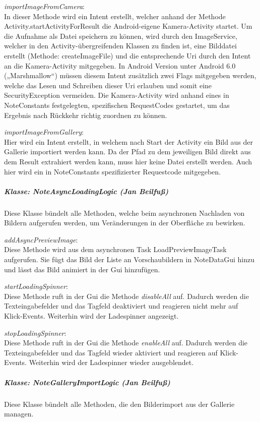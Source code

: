 \textit{importImageFromCamera}:\\
In dieser Methode wird ein Intent erstellt, welcher anhand der Methode Activity.startActivityForResult die Android-eigene Kamera-Activity startet. Um die Aufnahme als Datei speichern zu können, wird durch den ImageService, welcher in den Activity-übergreifenden Klassen zu finden ist, eine Bilddatei erstellt (Methode: createImageFile) und die entsprechende Uri durch den Intent an die Kamera-Activity mitgegeben. In Android Version unter Android 6.0 („Marshmallow“) müssen diesem Intent zusätzlich zwei Flags mitgegeben werden, welche das Lesen und Schreiben dieser Uri erlauben und somit eine SecurityException vermeiden.
Die Kamera-Activity wird anhand eines in NoteConstants festgelegten, spezifischen RequestCodes gestartet, um das Ergebnis nach Rückkehr richtig zuordnen zu können.

\textit{importImageFromGallery}:\\
Hier wird ein Intent erstellt, in welchem nach Start der Activity ein Bild aus der Gallerie importiert werden kann. Da der Pfad zu dem jeweiligen Bild direkt aus dem Result extrahiert werden kann, muss hier keine Datei erstellt werden. Auch hier wird ein in NoteConstants spezifizierter Requestcode mitgegeben. 

\subparagraph*{Klasse: NoteAsyncLoadingLogic (Jan Beilfuß)}
Diese Klasse bündelt alle Methoden, welche beim asynchronen Nachladen von Bildern aufgerufen werden, um Veränderungen in der Oberfläche zu bewirken.

\textit{addAsyncPreviewImage}:\\
Diese Methode wird aus dem asynchronen Task LoadPreviewImageTask aufgerufen. Sie fügt das Bild der Liste an Vorschaubildern in NoteDataGui hinzu und lässt das Bild animiert in der Gui hinzufügen.

\textit{startLoadingSpinner}:\\
Diese Methode ruft in der Gui die Methode \textit{disableAll} auf. Dadurch werden die Texteingabefelder und das Tagfeld deaktiviert und reagieren nicht mehr auf Klick-Events. Weiterhin wird der Ladespinner angezeigt.

\textit{stopLoadingSpinner}:\\
Diese Methode ruft in der Gui die Methode \textit{enableAll} auf. Dadurch werden die Texteingabefelder und das Tagfeld wieder aktiviert und reagieren auf Klick-Events. Weiterhin wird der Ladespinner wieder ausgeblendet.

\subparagraph*{Klasse: NoteGalleryImportLogic (Jan Beilfuß)}
Diese Klasse bündelt alle Methoden, die den Bilderimport aus der Gallerie managen.


